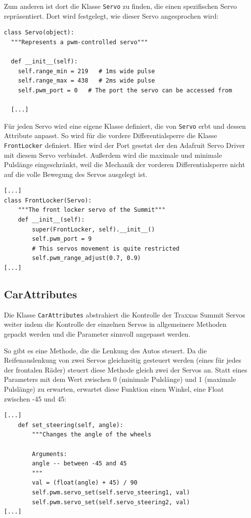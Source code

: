 \documentclass[a4paper,10pt]{scrartcl}
\begin{document}
    Zum anderen ist dort die Klasse \lstinline{Servo} zu finden, die einen
    spezifischen Servo repräsentiert.
    Dort wird festgelegt, wie dieser Servo angesprochen wird:
    \begin{lstlisting}
class Servo(object):
  """Represents a pwm-controlled servo"""

  def __init__(self):
    self.range_min = 219   # 1ms wide pulse
    self.range_max = 438   # 2ms wide pulse
    self.pwm_port = 0   # The port the servo can be accessed from

  [...]
    \end{lstlisting}

    Für jeden Servo wird eine eigene Klasse definiert, die von \lstinline{Servo}
    erbt und dessen Attribute anpasst.
    So wird für die vordere Differentialsperre die Klasse \lstinline{FrontLocker}
    definiert.
    Hier wird der Port gesetzt der den Adafruit Servo Driver mit diesem Servo
    verbindet.
    Außerdem wird die maximale und minimale Pulslänge eingeschränkt, weil die
    Mechanik der vorderen Differentialsperre nicht auf die volle Bewegung des
    Servos ausgelegt ist.
    \newpage
    \begin{lstlisting}
[...]
class FrontLocker(Servo):
    """The front locker servo of the Summit"""
    def __init__(self):
        super(FrontLocker, self).__init__()
        self.pwm_port = 9
        # This servos movement is quite restricted
        self.pwm_range_adjust(0.7, 0.9)
[...]
    \end{lstlisting}

  \subsection{CarAttributes}

    Die Klasse \lstinline{CarAttributes} abstrahiert die Kontrolle der Traxxas
    Summit Servos weiter indem die Kontrolle der einzelnen Servos in
    allgemeinere Methoden gepackt werden und die Parameter sinnvoll angepasst
    werden.

    So gibt es eine Methode, die die Lenkung des Autos steuert.
    Da die Reifenauslenkung von zwei Servos gleichzeitig gesteuert werden
    (eines für jedes der frontalen Räder) steuert diese Methode gleich zwei der
    Servos an.
    Statt eines Parameters mit dem Wert zwischen 0 (minimale Pulslänge) und 1
    (maximale Pulslänge) zu erwarten, erwartet diese Funktion einen Winkel,
    eine Float zwischen -45 und 45:
    \begin{lstlisting}
[...]
    def set_steering(self, angle):
        """Changes the angle of the wheels

        Arguments:
        angle -- between -45 and 45
        """
        val = (float(angle) + 45) / 90
        self.pwm.servo_set(self.servo_steering1, val)
        self.pwm.servo_set(self.servo_steering2, val)
[...]
    \end{lstlisting}
\end{document}
